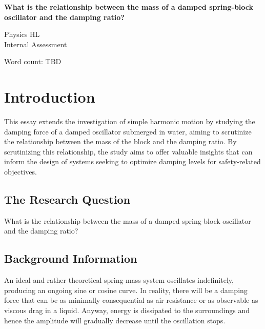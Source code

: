 \documentclass[a4paper,12pt]{article}
\begin{document}
\pagestyle{fancy}


\begin{titlepage}
  \begin{center}
    \vspace*{3cm}

    {\textbf{\Large{What is the relationship between the mass of a damped spring-block oscillator and the damping ratio?}}}

    \vspace{1cm}
    \large{Physics HL}\\
    \large{Internal Assessment}


    \vfill

    \vspace{1.5cm}

    Word count: TBD

  \end{center}
\end{titlepage}
\pagebreak
\tableofcontents
\pagebreak

\clearpage
\setcounter{page}{1}

\section{Introduction}
This essay extends the investigation of simple harmonic motion by studying the damping force of a damped oscillator submerged in water, aiming to scrutinize the relationship between the mass of the block and the damping ratio. By scrutinizing this relationship, the study aims to offer valuable insights that can inform the design of systems seeking to optimize damping levels for safety-related objectives.


\subsection{The Research Question}
What is the relationship between the mass of a damped spring-block oscillator and the damping ratio?

\subsection{Background Information}
An ideal and rather theoretical spring-mass system oscillates indefinitely, producing an ongoing sine or cosine curve. In reality, there will be a damping force that can be as minimally consequential as air resistance or as observable as viscous drag in a liquid. Anyway, energy is dissipated to the surroundings and hence the amplitude will gradually decrease until the oscillation stops.
\end{document}
